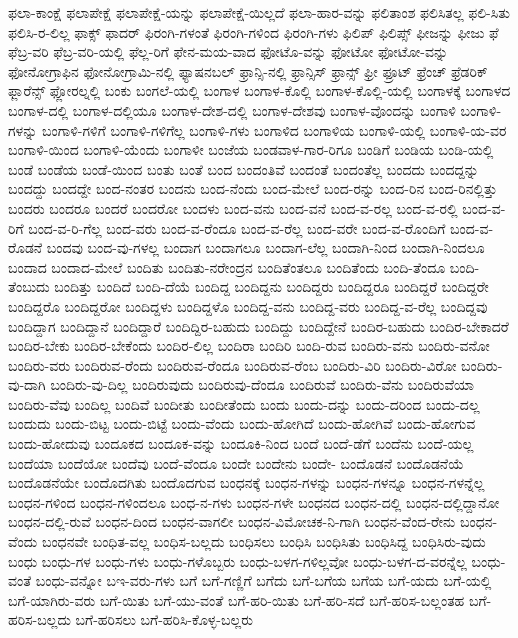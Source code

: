 {ಫಲಾ-ಕಾಂಕ್ಷೆ
ಫಲಾಪೇಕ್ಷೆ
ಫಲಾಪೇಕ್ಷೆ-ಯನ್ನು
ಫಲಾಪೇಕ್ಷೆ-ಯಿಲ್ಲದೆ
ಫಲಾ-ಹಾರ-ವನ್ನು
ಫಲಿತಾಂಶ
ಫಲಿಸಿತಲ್ಲ
ಫಲಿ-ಸಿತು
ಫಲಿಸಿ-ರ-ಲಿಲ್ಲ
ಫಾಕ್ಸ್
ಫಾದರ್
ಫಿರಂಗಿ-ಗಳಂತೆ
ಫಿರಂಗಿ-ಗಳಿಂದ
ಫಿರಂಗಿ-ಗಳು
ಫಿಲಿಪ್
ಫಿಲಿಪ್ಸ್
ಫೀಜನ್ನು
ಫೀಜು
ಫೆ
ಫೆಬ್ರ-ವರಿ
ಫೆಬ್ರ-ವರಿ-ಯಲ್ಲಿ
ಫೆಲ್ಲ-ರಿಗೆ
ಫೇನ-ಮಯ-ವಾದ
ಫೋಟೊ-ವನ್ನು
ಫೋಟೋ
ಫೋಟೋ-ವನ್ನು
ಫೋನೋಗ್ರಾಫಿನ
ಫೋನೋಗ್ರಾಮಿ-ನಲ್ಲಿ
ಫ್ಯಾಷನಬಲ್
ಫ್ರಾನ್ಸಿ-ನಲ್ಲಿ
ಫ್ರಾನ್ಸಿಸ್
ಫ್ರಾನ್ಸ್
ಫ್ರೀ
ಫ್ರೂಟ್
ಫ್ರೆಂಚ್
ಫ್ರೆಡರಿಕ್
ಫ್ಲಾರೆನ್ಸ್
ಫ್ಲೋರಲ್ನಲ್ಲಿ
ಬಂಕು
ಬಂಗಲೆ-ಯಲ್ಲಿ
ಬಂಗಾಳ
ಬಂಗಾಳ-ಕೊಲ್ಲಿ
ಬಂಗಾಳ-ಕೊಲ್ಲಿ-ಯಲ್ಲಿ
ಬಂಗಾಳಕ್ಕೆ
ಬಂಗಾಳದ
ಬಂಗಾಳ-ದಲ್ಲಿ
ಬಂಗಾಳ-ದಲ್ಲಿಯೂ
ಬಂಗಾಳ-ದೇಶ-ದಲ್ಲಿ
ಬಂಗಾಳ-ದೇಶವು
ಬಂಗಾಳ-ವೊಂದನ್ನು
ಬಂಗಾಳಿ
ಬಂಗಾಳಿ-ಗಳನ್ನು
ಬಂಗಾಳಿ-ಗಳಿಗೆ
ಬಂಗಾಳಿ-ಗಳಿಗೆಲ್ಲ
ಬಂಗಾಳಿ-ಗಳು
ಬಂಗಾಳಿದ
ಬಂಗಾಳಿಯ
ಬಂಗಾಳಿ-ಯಲ್ಲಿ
ಬಂಗಾಳಿ-ಯ-ವರ
ಬಂಗಾಳಿ-ಯಿಂದ
ಬಂಗಾಳಿ-ಯೆಂದು
ಬಂಗಾಳೀ
ಬಂಜೆಯ
ಬಂಡವಾಳ-ಗಾರ-ರಿಗೂ
ಬಂಡಿಗೆ
ಬಂಡಿಯ
ಬಂಡಿ-ಯಲ್ಲಿ
ಬಂಡೆ
ಬಂಡೆಯ
ಬಂಡೆ-ಯಿಂದ
ಬಂತು
ಬಂತೆ
ಬಂದ
ಬಂದಂತಿವೆ
ಬಂದಂತೆ
ಬಂದಂತೆಲ್ಲ
ಬಂದದು
ಬಂದದ್ದನ್ನು
ಬಂದದ್ದು
ಬಂದದ್ದೇ
ಬಂದ-ನಂತರ
ಬಂದನು
ಬಂದ-ನೆಂದು
ಬಂದ-ಮೇಲೆ
ಬಂದ-ರನ್ನು
ಬಂದ-ರಿನ
ಬಂದ-ರಿನಲ್ಲಿತ್ತು
ಬಂದರು
ಬಂದರೂ
ಬಂದರೆ
ಬಂದರೋ
ಬಂದಳು
ಬಂದ-ವನು
ಬಂದ-ವನೆ
ಬಂದ-ವ-ರಲ್ಲ
ಬಂದ-ವ-ರಲ್ಲಿ
ಬಂದ-ವ-ರಿಗೆ
ಬಂದ-ವ-ರಿ-ಗೆಲ್ಲ
ಬಂದ-ವರು
ಬಂದ-ವ-ರೆಂದೂ
ಬಂದ-ವ-ರೆಲ್ಲ
ಬಂದ-ವರೇ
ಬಂದ-ವ-ರೊಂದಿಗೆ
ಬಂದ-ವ-ರೊಡನೆ
ಬಂದವು
ಬಂದ-ವು-ಗಳಲ್ಲ
ಬಂದಾಗ
ಬಂದಾಗಲೂ
ಬಂದಾಗ-ಲೆಲ್ಲ
ಬಂದಾಗಿ-ನಿಂದ
ಬಂದಾಗಿ-ನಿಂದಲೂ
ಬಂದಾದ
ಬಂದಾದ-ಮೇಲೆ
ಬಂದಿತು
ಬಂದಿತು-ನರೇಂದ್ರನ
ಬಂದಿತೆಂತಲೂ
ಬಂದಿತೆಂದು
ಬಂದಿ-ತೆಂದೂ
ಬಂದಿ-ತೆಂಬುದು
ಬಂದಿತ್ತು
ಬಂದಿದೆ
ಬಂದಿ-ದೆಯೆ
ಬಂದಿದ್ದ
ಬಂದಿದ್ದನು
ಬಂದಿದ್ದರು
ಬಂದಿದ್ದರೂ
ಬಂದಿದ್ದರೆ
ಬಂದಿದ್ದರೇ
ಬಂದಿದ್ದರೊ
ಬಂದಿದ್ದರೋ
ಬಂದಿದ್ದಳು
ಬಂದಿದ್ದಳೊ
ಬಂದಿದ್ದ-ವನು
ಬಂದಿದ್ದ-ವರು
ಬಂದಿದ್ದ-ವ-ರೆಲ್ಲ
ಬಂದಿದ್ದವು
ಬಂದಿದ್ದಾಗ
ಬಂದಿದ್ದಾನೆ
ಬಂದಿದ್ದಾರೆ
ಬಂದಿದ್ದಿರ-ಬಹುದು
ಬಂದಿದ್ದು
ಬಂದಿದ್ದೇನೆ
ಬಂದಿರ-ಬಹುದು
ಬಂದಿರ-ಬೇಕಾದರೆ
ಬಂದಿರ-ಬೇಕು
ಬಂದಿರ-ಬೇಕೆಂದು
ಬಂದಿರ-ಲಿಲ್ಲ
ಬಂದಿರಾ
ಬಂದಿರಿ
ಬಂದಿ-ರುವ
ಬಂದಿರು-ವನು
ಬಂದಿರು-ವನೋ
ಬಂದಿರು-ವರು
ಬಂದಿರುವ-ರೆಂದು
ಬಂದಿರುವ-ರೆಂದೂ
ಬಂದಿರುವ-ರೆಂಬ
ಬಂದಿರು-ವಿರಿ
ಬಂದಿರು-ವಿರೋ
ಬಂದಿರು-ವು-ದಾಗಿ
ಬಂದಿರು-ವು-ದಿಲ್ಲ
ಬಂದಿರುವುದು
ಬಂದಿರುವು-ದೆಂದೂ
ಬಂದಿರುವೆ
ಬಂದಿರು-ವೆನು
ಬಂದಿರುವೆಯಾ
ಬಂದಿರು-ವೆವು
ಬಂದಿಲ್ಲ
ಬಂದಿವೆ
ಬಂದೀತು
ಬಂದೀತೆಂದು
ಬಂದು
ಬಂದು-ದನ್ನು
ಬಂದು-ದರಿಂದ
ಬಂದು-ದಲ್ಲ
ಬಂದುದು
ಬಂದು-ಬಿಟ್ಟ
ಬಂದು-ಬಿಟ್ಟೆ
ಬಂದು-ವೆಂದು
ಬಂದು-ಹೋಗಿದೆ
ಬಂದು-ಹೋಗಿವೆ
ಬಂದು-ಹೋಗುವ
ಬಂದು-ಹೋದುವು
ಬಂದೂಕದ
ಬಂದೂಕ-ವನ್ನು
ಬಂದೂಕಿ-ನಿಂದ
ಬಂದೆ
ಬಂದೆ-ಡೆಗೆ
ಬಂದೆನು
ಬಂದೆ-ಯಲ್ಲ
ಬಂದೆಯಾ
ಬಂದೆಯೋ
ಬಂದೆವು
ಬಂದೆ-ವೆಂದೂ
ಬಂದೇ
ಬಂದೇನು
ಬಂದೇ-
ಬಂದೊಡನೆ
ಬಂದೊಡನೆಯೆ
ಬಂದೊಡನೆಯೇ
ಬಂದೊದಗಿತು
ಬಂದೊದಗುವ
ಬಂಧನಕ್ಕೆ
ಬಂಧನ-ಗಳನ್ನು
ಬಂಧನ-ಗಳನ್ನೂ
ಬಂಧನ-ಗಳನ್ನೆಲ್ಲ
ಬಂಧನ-ಗಳಿಂದ
ಬಂಧನ-ಗಳಿಂದಲೂ
ಬಂಧ-ನ-ಗಳು
ಬಂಧನ-ಗಳೇ
ಬಂಧನದ
ಬಂಧನ-ದಲ್ಲಿ
ಬಂಧನ-ದಲ್ಲಿದ್ದಾನೋ
ಬಂಧನ-ದಲ್ಲಿ-ರುವೆ
ಬಂಧನ-ದಿಂದ
ಬಂಧನ-ವಾಗಲೀ
ಬಂಧನ-ವಿಮೋಚಕ-ನಿ-ಗಾಗಿ
ಬಂಧನ-ವೆಂದ-ರೇನು
ಬಂಧನ-ವೆಂದು
ಬಂಧನವೇ
ಬಂಧಿತ-ವಲ್ಲ
ಬಂಧಿಸ-ಬಲ್ಲದು
ಬಂಧಿಸಲು
ಬಂಧಿಸಿ
ಬಂಧಿಸಿತು
ಬಂಧಿಸಿದ್ದ
ಬಂಧಿಸಿರು-ವುದು
ಬಂಧು
ಬಂಧು-ಗಳ
ಬಂಧು-ಗಳು
ಬಂಧು-ಗಳೊಬ್ಬರು
ಬಂಧು-ಬಳಗ-ಗಳಿಲ್ಲವೋ
ಬಂಧು-ಬಳಗ-ದ-ವರನ್ನೆಲ್ಲ
ಬಂಧು-ವಂತೆ
ಬಂಧು-ವನ್ನೋ
ಬಇ-ವರು-ಗಳು
ಬಗೆ
ಬಗೆ-ಗಣ್ಣಿಗೆ
ಬಗೆದು
ಬಗೆ-ಬಗೆಯ
ಬಗೆಯ
ಬಗೆ-ಯದು
ಬಗೆ-ಯಲ್ಲಿ
ಬಗೆ-ಯಾಗಿರು-ವರು
ಬಗೆ-ಯಿತು
ಬಗೆ-ಯು-ವಂತೆ
ಬಗೆ-ಹರಿ-ಯಿತು
ಬಗೆ-ಹರಿ-ಸದೆ
ಬಗೆ-ಹರಿಸ-ಬಲ್ಲಂತಹ
ಬಗೆ-ಹರಿಸ-ಬಲ್ಲದು
ಬಗೆ-ಹರಿಸಲು
ಬಗೆ-ಹರಿಸಿ-ಕೊಳ್ಳ-ಬಲ್ಲರು
}
